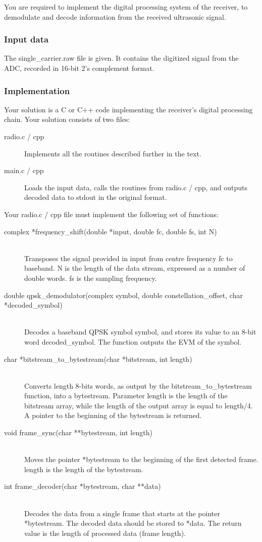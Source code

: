 \documentclass{article}
\begin{document}
You are required to implement the digital processing system of the receiver, to demodulate and decode information from the received ultrasonic signal.

\subsubsection{Input data}
The \textsf{single\_carrier.raw} file is given. It contains the digitized signal from the ADC, recorded in 16-bit 2's complement format.

\subsubsection{Implementation}
Your solution is a C or C++ code implementing the receiver's digital processing chain. Your solution consists of two files:
\begin{description}
	\item[radio.c / cpp] Implements all the routines described further in the text.
	\item[main.c / cpp] Loads the input data, calls the routines from \textsf{radio.c / cpp}, and outputs decoded data to stdout in the original format.
\end{description}

Your \textsf{radio.c / cpp} file must implement the following set of functions:
\begin{description}
	\item[complex *frequency\_shift(double *input, double fc, double fs, int N)]
	\,\\ Transposes the signal provided in input from centre frequency \textsf{fc} to baseband. \textsf{N} is the length of the data stream, expressed as a number of double words. \textsf{fs} is the sampling frequency.
	\item[double qpsk\_demodulator(complex symbol, double constellation\_offset, char *decoded\_symbol)]
	\,\\ Decodes a baseband QPSK symbol \textsf{symbol}, and stores its value to an 8-bit word \textsf{decoded\_symbol}. The function outputs the EVM of the symbol.
	\item[char *bitstream\_to\_bytestream(char *bitstream, int length)]
	\,\\ Converts \textsf{length} 8-bits words, as output by the \textsf{bitstream\_to\_bytestream} function, into a bytestream. Parameter \textsf{length} is the length of the bitstream array, while the length of the output array is equal to \textsf{length}/4. A pointer to the beginning of the bytestream is returned.
	\item[void frame\_sync(char **bytestream, int length)]
	\,\\ Moves the pointer \textsf{*bytestream} to the beginning of the first detected frame. \textsf{length} is the length of the bytestream.
	\item[int frame\_decoder(char *bytestream, char **data)]
	\,\\ Decodes the data from a single frame that starts at the pointer \textsf{*bytestream}. The decoded data should be stored to \textsf{*data}. The return value is the length of processed data (frame length).
\end{description}
\end{document}
